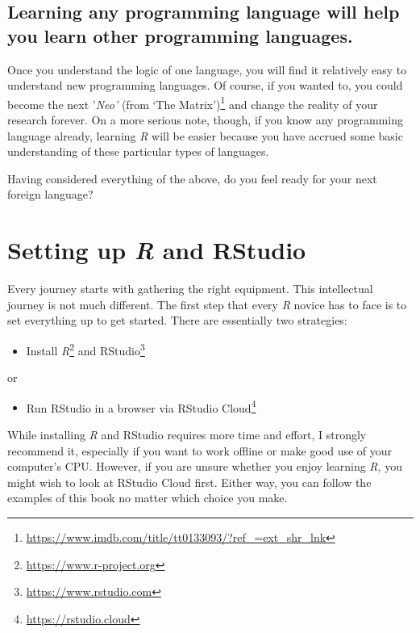 \documentclass[
  letterpaper,
]{krantz}
\providecommand{\tightlist}{%
  \setlength{\itemsep}{0pt}\setlength{\parskip}{0pt}}\usepackage{longtable,booktabs,array}
\renewcommand{\href}[2]{#2\footnote{\url{#1}}}
\begin{document}
\section{Learning any programming language will help you learn other
programming
languages.}\label{sec-learning-any-programming-language-will-help-you-learn-other-programming-languages.}

Once you understand the logic of one language, you will find it
relatively easy to understand new programming languages. Of course, if
you wanted to, you could become the next '\emph{Neo'} (from
\href{https://www.imdb.com/title/tt0133093/?ref_=ext_shr_lnk}{`The
Matrix')} and change the reality of your research forever. On a more
serious note, though, if you know any programming language already,
learning \emph{R} will be easier because you have accrued some basic
understanding of these particular types of languages.

Having considered everything of the above, do you feel ready for your
next foreign language?


\chapter{\texorpdfstring{Setting up \emph{R} and
RStudio}{Setting up R and RStudio}}\label{sec-setting-up-r-and-rstudio}

Every journey starts with gathering the right equipment. This
intellectual journey is not much different. The first step that every
\emph{R} novice has to face is to set everything up to get started.
There are essentially two strategies:

\begin{itemize}
\tightlist
\item
  Install \href{https://www.r-project.org}{\emph{R}} and
  \href{https://www.rstudio.com}{RStudio}
\end{itemize}

or

\begin{itemize}
\tightlist
\item
  Run RStudio in a browser via \href{https://rstudio.cloud}{RStudio
  Cloud}
\end{itemize}

While installing \emph{R} and RStudio requires more time and effort, I
strongly recommend it, especially if you want to work offline or make
good use of your computer's CPU. However, if you are unsure whether you
enjoy learning \emph{R}, you might wish to look at RStudio Cloud first.
Either way, you can follow the examples of this book no matter which
choice you make.
\end{document}
